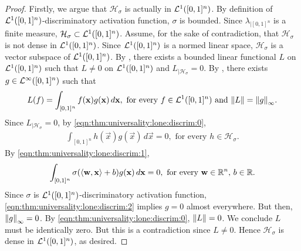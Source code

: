 \begin{proof}
Firstly, we argue that $\mathcal{H}_{\sigma}$ is actually in ${\mathcal {L}^1}([0,1]^n)$. By definition of ${\mathcal {L}^1}([0,1]^n)$-discriminatory activation function,
$\sigma$ is bounded. Since $\lambda_{|[0,1]^n}$ is a finite measure,  $\mathcal{H}_{\sigma} \subset {\mathcal {L}^1}([0,1]^n)$.
Assume, for the sake of contradiction, that  $\mathcal{H}_{\sigma}$ is not dense in ${\mathcal {L}^1}([0,1]^n)$. Since ${\mathcal {L}^1}([0,1]^n)$ is a normed linear space, $\mathcal{H}_{\sigma}$ is a vector subspace of ${\mathcal {L}^1}([0,1]^n)$.
By , there exists a bounded linear functional $L$ on ${\mathcal {L}^1}([0,1]^n)$ such that $L \neq 0$ on ${\mathcal {L}^1}([0,1]^n)$ and $L_{|\mathcal{H}_{\sigma}} = 0$. By , there exists $g \in {\mathcal {L}^\infty}([0,1]^n)$ such that \begin{align}
    \label{eqn:thm:universality:lone:discrim:0}
    L (f) = \int_{[0,1]^n} f(\mathbf{x}) g(\mathbf{x}) \, d\mathbf{x}, \text{ for every $f \in {\mathcal {L}^1}([0,1]^n)$ and $\left\lVert L\right\rVert = \left\lVert g\right\rVert_\infty$}.
\end{align}
Since $L_{|\mathcal{H}_{\sigma}} = 0$, by \ref{eqn:thm:universality:lone:discrim:0},
\begin{align}
     \label{eqn:thm:universality:lone:discrim:1}
     \int_{[0,1]^n} h(\vec{x}) g(\vec{x}) \, d\vec{x} = 0, \text{ for every $h \in \mathcal{H}_\sigma$}.
\end{align}
By \ref{eqn:thm:universality:lone:discrim:1}, 
\begin{align}
     \label{eqn:thm:universality:lone:discrim:2}
     \int_{[0,1]^n} \sigma(\langle \mathbf{w}, \mathbf{x} \rangle + b) g(\mathbf{x}) \, d\mathbf{x} = 0, \text{ for every $\mathbf{w} \in {\mathbb R}^n$, $b \in {\mathbb R}$}.
\end{align}
Since $\sigma$ is ${\mathcal {L}^1}([0,1]^n)$-discriminatory activation function, \ref{eqn:thm:universality:lone:discrim:2} implies $g = 0$ almost everywhere.
But then, $\left\lVert g\right\rVert_\infty = 0$. By \ref{eqn:thm:universality:lone:discrim:0}, $\left\lVert L\right\rVert = 0$. We conclude $L$ must be identically zero. But this is a contradiction since $L \neq 0$. Hence $\mathcal{H}_{\sigma}$ is dense in ${\mathcal {L}^1}([0,1]^n)$, as desired.
\end{proof}